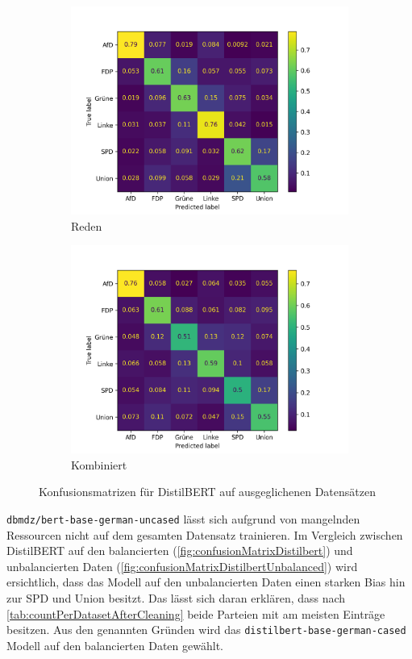 \begin{figure}[H]
\begin{subfigure}{0.49\textwidth}
    \includegraphics[width=\textwidth]{data/images/modeling/bert/under/speeches_confusion_matrix.png}
    \caption{Reden} \label{sfig:confusionMatrixBertSpeeches}
  \end{subfigure}
  \hfill
  \begin{subfigure}{0.49\textwidth}
    \includegraphics[width=\textwidth]{data/images/modeling/bert/under/all_confusion_matrix.png}
    \caption{Kombiniert} \label{sfig:confusionMatrixBertAll}
  \end{subfigure}
  \caption{Konfusionsmatrizen für DistilBERT auf ausgeglichenen Datensätzen} \label{fig:confusionMatrixDistilbert}
\end{figure}

\texttt{dbmdz/bert-base-german-uncased} lässt sich aufgrund von mangelnden Ressourcen nicht auf dem gesamten Datensatz trainieren. Im Vergleich zwischen DistilBERT auf den balancierten (\autoref{fig:confusionMatrixDistilbert}) und unbalancierten Daten (\autoref{fig:confusionMatrixDistilbertUnbalanced}) wird ersichtlich, dass das Modell auf den unbalancierten Daten einen starken Bias hin zur \ac{SPD} und Union besitzt. Das lässt sich daran erklären, dass nach \autoref{tab:countPerDatasetAfterCleaning} beide Parteien mit am meisten Einträge besitzen. Aus den genannten Gründen wird das \texttt{distilbert-base-german-cased} Modell auf den balancierten Daten gewählt.

